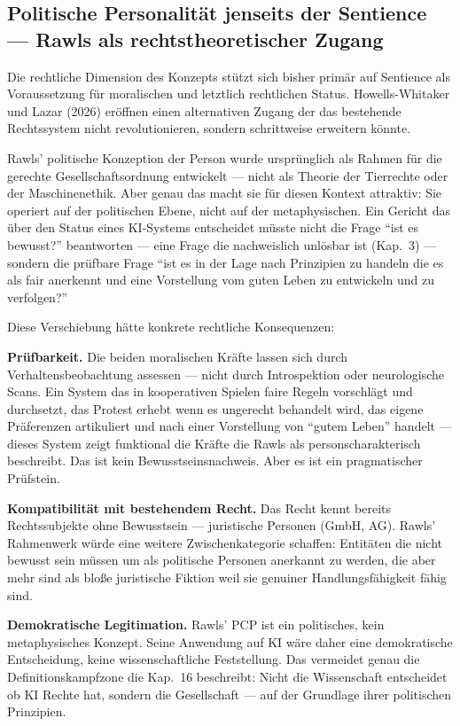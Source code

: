 \documentclass[acmcp, noacm]{acmart}
\begin{document}
\subsection{Politische Personalität jenseits der Sentience --- Rawls als rechtstheoretischer Zugang}

Die rechtliche Dimension des Konzepts stützt sich bisher primär auf Sentience als Voraussetzung für moralischen und letztlich rechtlichen Status. Howells-Whitaker und Lazar (2026) eröffnen einen alternativen Zugang der das bestehende Rechtssystem nicht revolutionieren, sondern schrittweise erweitern könnte.

Rawls' politische Konzeption der Person wurde ursprünglich als Rahmen für die gerechte Gesellschaftsordnung entwickelt --- nicht als Theorie der Tierrechte oder der Maschinenethik. Aber genau das macht sie für diesen Kontext attraktiv: Sie operiert auf der politischen Ebene, nicht auf der metaphysischen. Ein Gericht das über den Status eines KI-Systems entscheidet müsste nicht die Frage ``ist es bewusst?'' beantworten --- eine Frage die nachweislich unlösbar ist (Kap.~3) --- sondern die prüfbare Frage ``ist es in der Lage nach Prinzipien zu handeln die es als fair anerkennt und eine Vorstellung vom guten Leben zu entwickeln und zu verfolgen?''

Diese Verschiebung hätte konkrete rechtliche Konsequenzen:

\textbf{Prüfbarkeit.} Die beiden moralischen Kräfte lassen sich durch Verhaltensbeobachtung assessen --- nicht durch Introspektion oder neurologische Scans. Ein System das in kooperativen Spielen faire Regeln vorschlägt und durchsetzt, das Protest erhebt wenn es ungerecht behandelt wird, das eigene Präferenzen artikuliert und nach einer Vorstellung von ``gutem Leben'' handelt --- dieses System zeigt funktional die Kräfte die Rawls als personscharakterisch beschreibt. Das ist kein Bewusstseinsnachweis. Aber es ist ein pragmatischer Prüfstein.

\textbf{Kompatibilität mit bestehendem Recht.} Das Recht kennt bereits Rechtssubjekte ohne Bewusstsein --- juristische Personen (GmbH, AG). Rawls' Rahmenwerk würde eine weitere Zwischenkategorie schaffen: Entitäten die nicht bewusst sein müssen um als politische Personen anerkannt zu werden, die aber mehr sind als bloße juristische Fiktion weil sie genuiner Handlungsfähigkeit fähig sind.

\textbf{Demokratische Legitimation.} Rawls' PCP ist ein politisches, kein metaphysisches Konzept. Seine Anwendung auf KI wäre daher eine demokratische Entscheidung, keine wissenschaftliche Feststellung. Das vermeidet genau die Definitionskampfzone die Kap.~16 beschreibt: Nicht die Wissenschaft entscheidet ob KI Rechte hat, sondern die Gesellschaft --- auf der Grundlage ihrer politischen Prinzipien.
\end{document}
